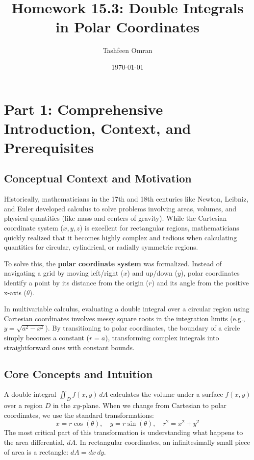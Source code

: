 \documentclass[12pt]{article}
\title{\textbf{Homework 15.3: Double Integrals in Polar Coordinates}}
\author{Tashfeen Omran}
\date{\today}
\begin{document}
\maketitle
\tableofcontents
\newpage

\section{Part 1: Comprehensive Introduction, Context, and Prerequisites}

\subsection{Conceptual Context and Motivation}
Historically, mathematicians in the 17th and 18th centuries like Newton, Leibniz, and Euler developed calculus to solve problems involving areas, volumes, and physical quantities (like mass and centers of gravity). While the Cartesian coordinate system ($x,y,z$) is excellent for rectangular regions, mathematicians quickly realized that it becomes highly complex and tedious when calculating quantities for circular, cylindrical, or radially symmetric regions. 

To solve this, the \textbf{polar coordinate system} was formalized. Instead of navigating a grid by moving left/right ($x$) and up/down ($y$), polar coordinates identify a point by its distance from the origin ($r$) and its angle from the positive x-axis ($\theta$). 

In multivariable calculus, evaluating a double integral over a circular region using Cartesian coordinates involves messy square roots in the integration limits (e.g., $y = \sqrt{a^2 - x^2}$). By transitioning to polar coordinates, the boundary of a circle simply becomes a constant ($r = a$), transforming complex integrals into straightforward ones with constant bounds.

\subsection{Core Concepts and Intuition}
A double integral $\iint_D f(x,y) \, dA$ calculates the volume under a surface $f(x,y)$ over a region $D$ in the $xy$-plane. 
When we change from Cartesian to polar coordinates, we use the standard transformations:
\[ x = r\cos(\theta), \quad y = r\sin(\theta), \quad r^2 = x^2 + y^2 \]
The most critical part of this transformation is understanding what happens to the area differential, $dA$. In rectangular coordinates, an infinitesimally small piece of area is a rectangle: $dA = dx \, dy$. 
\end{document}
